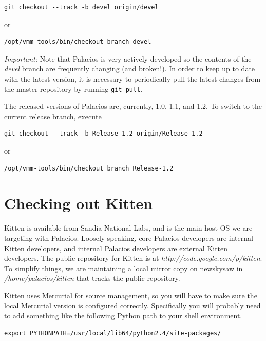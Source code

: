 \documentclass[11pt]{article}
\begin{document}
\begin{verbatim}
git checkout --track -b devel origin/devel
\end{verbatim}

or 

\begin{verbatim}
/opt/vmm-tools/bin/checkout_branch devel
\end{verbatim}


{\em Important:} Note that Palacios is very actively developed so the
contents of the {\em devel} branch are frequently changing (and
broken!). In order to keep up to date with the latest version, it is
necessary to periodically pull the latest changes from the master
repository by running \verb.git pull..


The released versions of Palacios are, currently, 1.0, 1.1, and 1.2.
To switch to the current release branch, execute

\begin{verbatim}
git checkout --track -b Release-1.2 origin/Release-1.2
\end{verbatim}

or 

\begin{verbatim}
/opt/vmm-tools/bin/checkout_branch Release-1.2
\end{verbatim}




\section{Checking out Kitten}

Kitten is available from Sandia National Labs, and is the main host OS
we are targeting with Palacios. Loosely speaking, core Palacios
developers are internal Kitten developers, and internal Palacios
developers are external Kitten developers. The public repository for
Kitten is at {\em http://code.google.com/p/kitten}.  To simplify
things, we are maintaining a local mirror copy on newskysaw in {\em
/home/palacios/kitten} that tracks the public repository.   

Kitten uses Mercurial for source management, so you will have to make
sure the local Mercurial version is configured correctly.
Specifically you will probably need to add something like the
following Python path to your shell environment.

\begin{verbatim}
export PYTHONPATH=/usr/local/lib64/python2.4/site-packages/
\end{verbatim}
\end{document}
